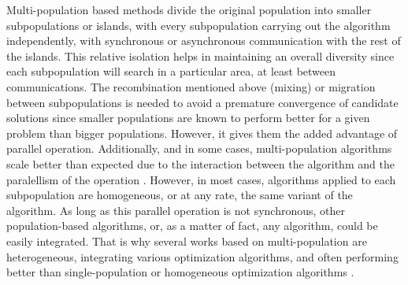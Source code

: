 \documentclass[runningheads]{llncs}
\begin{document}
Multi-population based methods divide the original population into
smaller subpopulations or islands, with every subpopulation carrying out the
algorithm independently, with synchronous or asynchronous communication with the
rest of the islands. This relative isolation helps in maintaining an overall
diversity since each subpopulation will search in a particular area, at least
between communications. The recombination mentioned above (mixing) or migration
between subpopulations is needed to avoid a premature convergence of candidate
solutions since smaller populations are known to perform better for a given
problem than bigger populations. However, it gives them the added advantage of
parallel operation. Additionally, and in some cases, multi-population algorithms
scale better than expected due to the interaction between the algorithm and the
paralellism of the operation \cite{ALBA20027}.
However, in most cases, algorithms applied to each subpopulation are
homogeneous, or at any rate, the same variant of the algorithm. As long as this
parallel operation is not synchronous, other population-based algorithms, or, as
a matter of fact, any algorithm, could be easily integrated. That is why several
works based on multi-population are heterogeneous, integrating various
optimization algorithms, and often performing better than single-population or
homogeneous optimization algorithms \cite{wu2016differential,nseef2016adaptive}.
\end{document}
